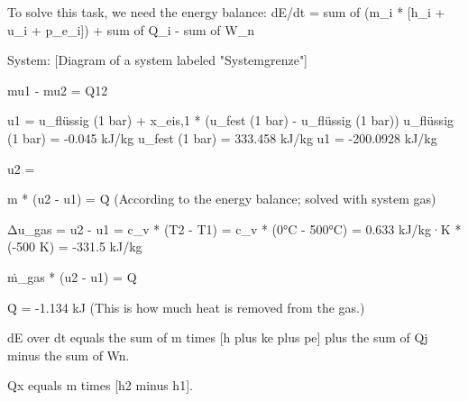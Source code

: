 To solve this task, we need the energy balance:  
dE/dt = sum of (m_i * [h_i + u_i + p_e_i]) + sum of Q_i - sum of W_n  

System:  
[Diagram of a system labeled "Systemgrenze"]  

mu1 - mu2 = Q12  

u1 = u_flüssig (1 bar) + x_eis,1 * (u_fest (1 bar) - u_flüssig (1 bar))  
u_flüssig (1 bar) = -0.045 kJ/kg  
u_fest (1 bar) = 333.458 kJ/kg  
u1 = -200.0928 kJ/kg  

u2 =  

m * (u2 - u1) = Q̇  
(According to the energy balance; solved with system gas)  

Δu_gas =  
u2 - u1 = c_v * (T2 - T1) = c_v * (0°C - 500°C) = 0.633 kJ/kg·K * (-500 K) = -331.5 kJ/kg  

ṁ_gas * (u2 - u1) = Q  

Q̇ = -1.134 kJ  
(This is how much heat is removed from the gas.)

dE over dt equals the sum of m times [h plus ke plus pe] plus the sum of Qj minus the sum of Wn.  

Qx equals m times [h2 minus h1].